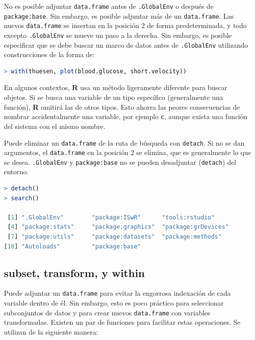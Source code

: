 No es posible adjuntar \texttt{data.frame} antes de \texttt{.GlobalEnv} o después de
\texttt{package:base}. Sin embargo, es posible adjuntar más de un \texttt{data.frame}. Las
nuevos \texttt{data.frame} se insertan en la posición 2 de forma predeterminada, y
todo excepto \texttt{.GlobalEnv} se mueve un paso a la derecha. Sin embargo, es posible
especificar que se debe buscar un marco de datos antes de \texttt{.GlobalEnv} utilizando
construcciones de la forma de:

\begin{lstlisting}[language=R]
> with(thuesen, plot(blood.glucose, short.velocity))
\end{lstlisting}

En algunos contextos, \textbf{R} usa un método ligeramente diferente para
buscar objetos. Si se busca una variable de un tipo específico (generalmente
una función), \textbf{R} omitirá las de otros tipos. Esto ahorra las peores
consecuencias de nombrar accidentalmente una variable, por ejemplo \texttt{c},
aunque exista una función del sistema con el mismo nombre.

Puede eliminar un \texttt{data.frame} de la ruta de búsqueda con
\texttt{detach}. Si no se dan argumentos, el \texttt{data.frame} en la posición
2 se elimina, que es generalmente lo que se desea. \texttt{.GlobalEnv} y
\texttt{package:base} no se pueden desadjuntar (\texttt{detach}) del entorno.

\begin{lstlisting}[language=R]
> detach()
> search()

 [1] ".GlobalEnv"        "package:ISwR"      "tools:rstudio"
 [4] "package:stats"     "package:graphics"  "package:grDevices"
 [7] "package:utils"     "package:datasets"  "package:methods"
[10] "Autoloads"         "package:base"
\end{lstlisting}

\subsection{subset, transform, y within}

Puede adjuntar un \texttt{data.frame} para evitar la engorrosa indexación de cada
variable dentro de él. Sin embargo, esto es poco práctico para seleccionar
subconjuntos de datos y para crear nuevos \texttt{data.frame} con variables
transformadas. Existen un par de funciones para facilitar estas operaciones. Se
utilizan de la siguiente manera:

